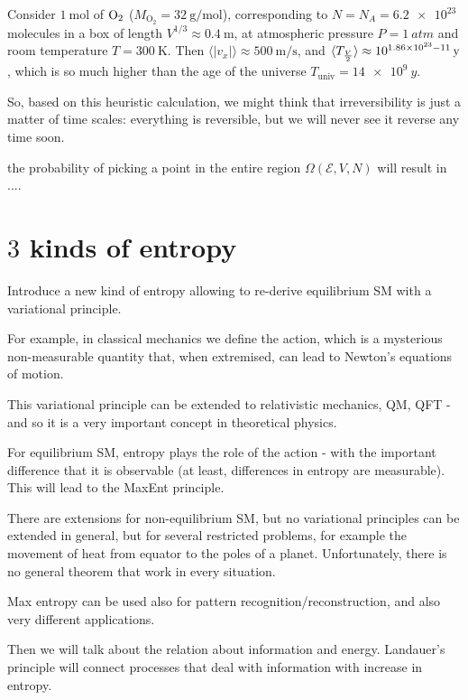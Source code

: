 \documentclass[../template.tex]{subfiles}
\begin{document}
Consider $\SI{1}{\mol}$ of $\rm{O}_2$ ($M_{\mathrm{O}_2} = \SI{32}{\g\per\mol}$), corresponding to $N=N_A = \num{6.2e23}$ molecules in a box of length $V^{1/3} \approx \SI{0.4}{\m}$, at atmospheric pressure $P=\SI{1}{atm}$ and room temperature $T= \SI{300}{\K}$. Then $\langle |v_x| \rangle \approx \SI{500}{\m\per\s}$, and $\langle T_{\frac{V}{2}} \rangle \approx 10^{1.86 \times 10^{23}-11}\,\rm{y}$, which is so much higher than the age of the universe $T_{\mathrm{univ}} = \SI{14e9}{y}$.

\medskip

So, based on this heuristic calculation, we might think that irreversibility is just a matter of time scales: everything is reversible, but we will never see it reverse any time soon.



the probability of picking a point in the entire region $\Omega(\mathcal{E}, V, N)$ will result in ....


\section{$3$ kinds of entropy}
Introduce a new kind of entropy allowing to re-derive equilibrium SM with a variational principle.

For example, in classical mechanics we define the action, which is a mysterious non-measurable quantity that, when extremised, can lead to Newton's equations of motion.

This variational principle can be extended to relativistic mechanics, QM, QFT - and so it is a very important concept in theoretical physics.

For equilibrium SM, entropy plays the role of the action - with the important difference that it is observable (at least, differences in entropy are measurable). This will lead to the MaxEnt principle.

There are extensions for non-equilibrium SM, but no variational principles can be extended in general, but for several restricted problems, for example the movement of heat from equator to the poles of a planet. Unfortunately, there is no general theorem that work in every situation. 

Max entropy can be used also for pattern recognition/reconstruction, and also very different applications.

Then we will talk about the relation about information and energy. Landauer's principle will connect processes that deal with information with increase in entropy. %
\end{document}
